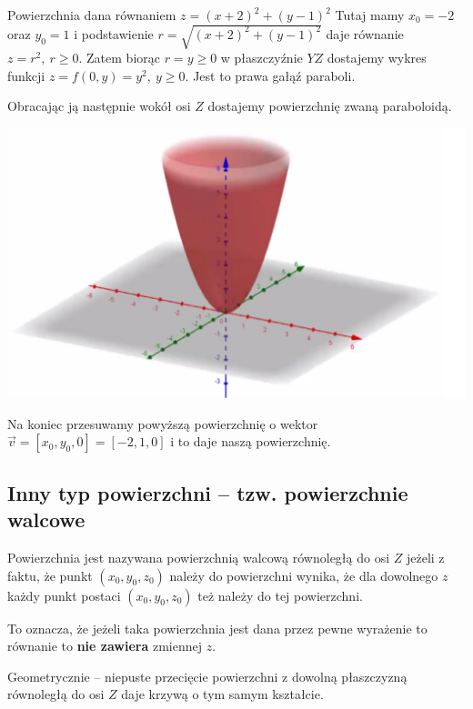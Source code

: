 \begin{przyklad}
Powierzchnia dana równaniem $ z = (x+2)^2 + (y-1)^2 $
Tutaj mamy $ x_0 = -2 $ oraz $ y_0 = 1 $ i podstawienie $ r = \sqrt{(x+2)^2 + (y-1)^2} $ daje równanie $ z = r^2, \ r \geq 0 $.
Zatem biorąc $ r = y \geq 0 $ w płaszczyźnie $YZ$ dostajemy wykres funkcji $ z = f(0, y) = y^2, \ y \geq 0 $. Jest to prawa gałąź
paraboli.

Obracając ją następnie wokół osi $Z$ dostajemy powierzchnię zwaną paraboloidą.

\begin{center}
\includegraphics[scale=0.6]{img/paraboloida.png}
\end{center}

Na koniec przesuwamy powyższą powierzchnię o wektor $ \vec{v} = [x_0, y_0, 0] = [-2, 1, 0] $ i to daje naszą powierzchnię.
\end{przyklad}

\subsection*{Inny typ powierzchni -- tzw. powierzchnie walcowe}

Powierzchnia jest nazywana powierzchnią walcową równoległą do osi $Z$ jeżeli z faktu, że punkt $ (x_0,y_0,z_0) $
należy do powierzchni wynika, że dla dowolnego $z$ każdy punkt postaci $(x_0, y_0, z_0)$ też należy do tej powierzchni.

To oznacza, że jeżeli taka powierzchnia jest dana przez pewne wyrażenie to równanie to \textbf{nie zawiera} zmiennej $z$.

Geometrycznie -- niepuste przecięcie powierzchni z dowolną płaszczyzną równoległą do osi $Z$ daje krzywą o tym samym kształcie.

